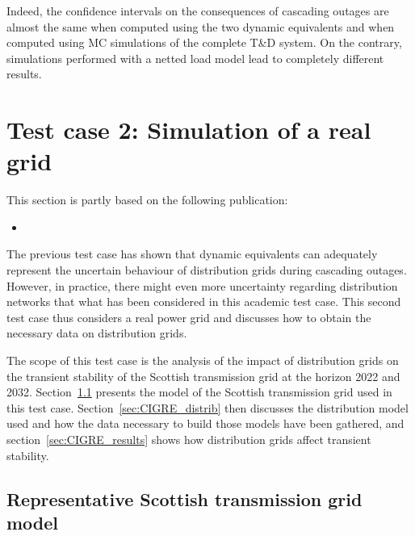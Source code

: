 Indeed, the confidence intervals on the consequences of cascading outages are almost the same when computed using the two dynamic equivalents and when computed using MC simulations of the complete T\&D system. On the contrary, simulations performed with a netted load model lead to completely different results.



\section{Test case 2: Simulation of a real grid}
\label{sec:distrib_CIGRE}

\begin{tcolorbox}[width=\linewidth, sharp corners=all,
    colback=white!80!black,
    colframe=white!80!black]
This section is partly based on the following publication:
\begin{itemize}
    \item {}
\end{itemize}
\end{tcolorbox}

The previous test case has shown that dynamic equivalents can adequately represent the uncertain behaviour of distribution grids during cascading outages. However, in practice, there might even more uncertainty regarding distribution networks that what has been considered in this academic test case. This second test case thus considers a real power grid and discusses how to obtain the necessary data on distribution grids.

The scope of this test case is the analysis of the impact of distribution grids on the transient stability of the Scottish transmission grid at the horizon 2022 and 2032. Section~\ref{sec:CIGRE_transmission} presents the model of the Scottish transmission grid used in this test case. Section~\ref{sec:CIGRE_distrib} then discusses the distribution model used and how the data necessary to build those models have been gathered, and section~\ref{sec:CIGRE_results} shows how distribution grids affect transient stability.

\subsection{Representative Scottish transmission grid model}
\label{sec:CIGRE_transmission}

